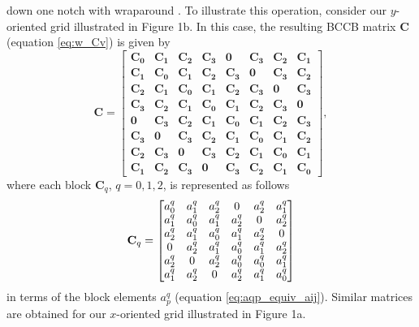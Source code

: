 \documentclass[manuscript,revised]{geophysics}
\begin{document}
down one notch with wraparound \citep[][ p. 20]{golub-vanloan2013}.
To illustrate this operation, consider our $y$-oriented grid illustrated in Figure 1b. 
In this case, the resulting 
BCCB matrix $\mathbf{C}$ (equation \ref{eq:w_Cv}) is given by 
\begin{equation}
\mathbf{C} =
\begin{bmatrix}
	\mathbf{C_{0}} & \mathbf{C_{1}} & \mathbf{C_{2}} & \mathbf{C_{3}} & \mathbf{0}     & \mathbf{C_{3}} & \mathbf{C_{2}} & \mathbf{C_{1}} \\
	\mathbf{C_{1}} & \mathbf{C_{0}} & \mathbf{C_{1}} & \mathbf{C_{2}} & \mathbf{C_{3}} & \mathbf{0}     & \mathbf{C_{3}} & \mathbf{C_{2}} \\
	\mathbf{C_{2}} & \mathbf{C_{1}} & \mathbf{C_{0}} & \mathbf{C_{1}} & \mathbf{C_{2}} & \mathbf{C_{3}} & \mathbf{0}     & \mathbf{C_{3}} \\
	\mathbf{C_{3}} & \mathbf{C_{2}} & \mathbf{C_{1}} & \mathbf{C_{0}} & \mathbf{C_{1}} & \mathbf{C_{2}} & \mathbf{C_{3}} & \mathbf{0}     \\
	\mathbf{0}     & \mathbf{C_{3}} & \mathbf{C_{2}} & \mathbf{C_{1}} & \mathbf{C_{0}} & \mathbf{C_{1}} & \mathbf{C_{2}} & \mathbf{C_{3}} \\
	\mathbf{C_{3}} & \mathbf{0}     & \mathbf{C_{3}} & \mathbf{C_{2}} & \mathbf{C_{1}} & \mathbf{C_{0}} & \mathbf{C_{1}} & \mathbf{C_{2}} \\
	\mathbf{C_{2}} & \mathbf{C_{3}} & \mathbf{0}     & \mathbf{C_{3}} & \mathbf{C_{2}} & \mathbf{C_{1}} & \mathbf{C_{0}} & \mathbf{C_{1}} \\
	\mathbf{C_{1}} & \mathbf{C_{2}} & \mathbf{C_{3}} & \mathbf{0}     & \mathbf{C_{3}} & \mathbf{C_{2}} & \mathbf{C_{1}} & \mathbf{C_{0}}
\end{bmatrix},
\label{eq:C-y-oriented}
\end{equation}
where each block $\mathbf{C}_{q}$, $q = 0, 1, 2$, is represented as follows 
\begin{equation}
\tensor{C}_{q} =
\begin{bmatrix}
	a^{q}_{0} & a^{q}_{1} & a^{q}_{2} & 0         & a^{q}_{2} & a^{q}_{1} \\
	a^{q}_{1} & a^{q}_{0} & a^{q}_{1} & a^{q}_{2} & 0         & a^{q}_{2} \\
	a^{q}_{2} & a^{q}_{1} & a^{q}_{0} & a^{q}_{1} & a^{q}_{2} & 0         \\
	0         & a^{q}_{2} & a^{q}_{1} & a^{q}_{0} & a^{q}_{1} & a^{q}_{2} \\
	a^{q}_{2} & 0         & a^{q}_{2} & a^{q}_{0} & a^{q}_{0} & a^{q}_{1} \\
	a^{q}_{1} & a^{q}_{2} & 0         & a^{q}_{2} & a^{q}_{1} & a^{q}_{0}
\end{bmatrix}
\label{eq:Cq-y-oriented}
\end{equation}
in terms of the block elements $a^{q}_{p}$ (equation \ref{eq:aqp_equiv_aij}).
Similar matrices are obtained for our $x$-oriented grid illustrated in Figure 1a.
\end{document}
